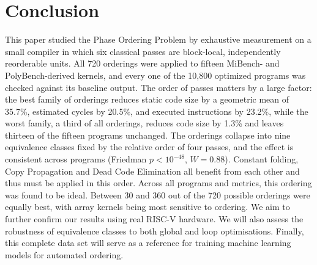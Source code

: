 \documentclass[conference,a4paper]{IEEEtran}
\begin{document}
\section{Conclusion}
This paper studied the Phase Ordering Problem by exhaustive measurement on a small compiler in which six classical passes are block-local, independently reorderable units. All 720 orderings were applied to fifteen MiBench- and PolyBench-derived kernels, and every one of the 10,800 optimized programs was checked against its baseline output. The order of passes matters by a large factor: the best family of orderings reduces static code size by a geometric mean of 35.7\%, estimated cycles by 20.5\%, and executed instructions by 23.2\%, while the worst family, a third of all orderings, reduces code size by 1.3\% and leaves thirteen of the fifteen programs unchanged. The orderings collapse into nine equivalence classes fixed by the relative order of four passes, and the effect is consistent across programs (Friedman $p < 10^{-48}$, $W = 0.88$). Constant folding, Copy Propagation and Dead Code Elimination all benefit from each other and thus must be applied in this order. Across all programs and metrics, this ordering was found to be ideal. Between 30 and 360 out of the 720 possible orderings were equally best, with array kernels being most sensitive to ordering. We aim to further confirm our results using real RISC-V hardware. We will also assess the robustness of equivalence classes to both global and loop optimisations. Finally, this complete data set will serve as a reference for training machine learning models for automated ordering.
\end{document}
